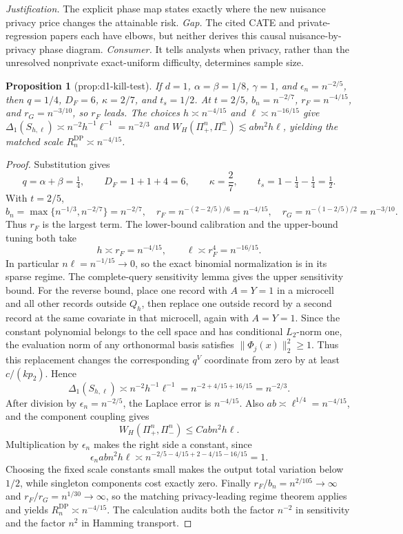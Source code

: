 \documentclass{article}
\newtheorem{proposition}{Proposition}
\begin{document}
\par\smallskip\noindent \textit{Justification.} The explicit phase map states exactly where the new nuisance privacy price changes the attainable risk. \textit{Gap.} The cited CATE and private-regression papers each have elbows, but neither derives this causal nuisance-by-privacy phase diagram. \textit{Consumer.} It tells analysts when privacy, rather than the unresolved nonprivate exact-uniform difficulty, determines sample size.

\begin{proposition}[prop:d1-kill-test]\label{prop:d1-kill-test}
If \(d=1\), \(\alpha=\beta=1/8\), \(\gamma=1\), and \(\epsilon_n=n^{-2/5}\), then \(q=1/4\), \(D_F=6\), \(\kappa=2/7\), and \(t_s=1/2\). At \(t=2/5\), \(b_n=n^{-2/7}\), \(r_F=n^{-4/15}\), and \(r_G=n^{-3/10}\), so \(r_F\) leads. The choices \(h\asymp n^{-4/15}\) and \(\ell\asymp n^{-16/15}\) give \(\Delta_1(S_{h,\ell})\asymp n^{-2}h^{-1}\ell^{-1}=n^{-2/3}\) and \(W_H(\Pi_+^n,\Pi_-^n)\lesssim abn^2h\ell\), yielding the matched scale \(R_n^{\mathrm{DP}}\asymp n^{-4/15}\).
\end{proposition}
\begin{proof}
Substitution gives
\[
 q=\alpha+\beta=\tfrac14,
 \qquad D_F=1+1+4=6,
 \qquad \kappa=\frac{2}{7},
 \qquad t_s=1-\tfrac14-\tfrac14=\tfrac12.
\]
With \(t=2/5\),
\[
 b_n=\max\{n^{-1/3},n^{-2/7}\}=n^{-2/7},
 \quad r_F=n^{-(2-2/5)/6}=n^{-4/15},
 \quad r_G=n^{-(1-2/5)/2}=n^{-3/10}.
\]
Thus \(r_F\) is the largest term.  The lower-bound calibration and the upper-bound tuning both take
\[
 h\asymp r_F=n^{-4/15},
 \qquad \ell\asymp r_F^4=n^{-16/15}.
\]
In particular \(n\ell=n^{-1/15}\to0\), so the exact binomial normalization is in its sparse regime.  The complete-query sensitivity lemma gives the upper sensitivity bound.  For the reverse bound, place one record with \(A=Y=1\) in a microcell and all other records outside \(Q_h\), then replace one outside record by a second record at the same covariate in that microcell, again with \(A=Y=1\).  Since the constant polynomial belongs to the cell space and has conditional \(L_2\)-norm one, the evaluation norm of any orthonormal basis satisfies \(\|\Phi_j(x)\|_2^2\ge1\).  Thus this replacement changes the corresponding \(q^V\) coordinate from zero by at least \(c/(kp_2)\).  Hence
\[
 \Delta_1(S_{h,\ell})\asymp n^{-2}h^{-1}\ell^{-1}
 =n^{-2+4/15+16/15}=n^{-2/3}.
\]
After division by \(\epsilon_n=n^{-2/5}\), the Laplace error is \(n^{-4/15}\).  Also \(ab\asymp\ell^{1/4}=n^{-4/15}\), and the component coupling gives
\[
 W_H(\Pi_+^n,\Pi_-^n)\le Cabn^2h\ell.
\]
Multiplication by \(\epsilon_n\) makes the right side a constant, since
\[
 \epsilon_nabn^2h\ell
 \asymp n^{-2/5-4/15+2-4/15-16/15}=1.
\]
Choosing the fixed scale constants small makes the output total variation below \(1/2\), while singleton components cost exactly zero.  Finally \(r_F/b_n=n^{2/105}\to\infty\) and \(r_F/r_G=n^{1/30}\to\infty\), so the matching privacy-leading regime theorem applies and yields \(R_n^{\mathrm{DP}}\asymp n^{-4/15}\).  The calculation audits both the factor \(n^{-2}\) in sensitivity and the factor \(n^2\) in Hamming transport.
\end{proof}
\end{document}
